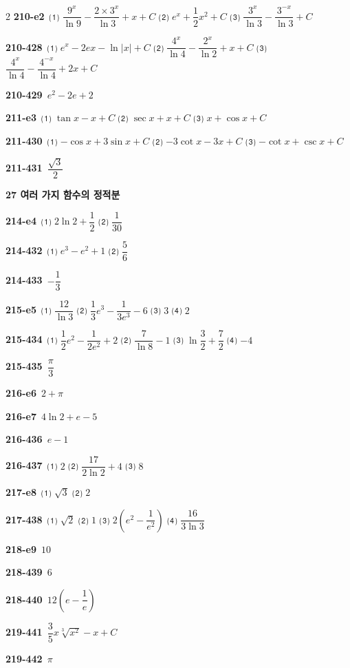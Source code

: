 \documentclass[10pt,a4paper]{article}
\begin{document}
\begin{multicols}{2}
\noindent\textbf{210-e2}\ ⑴ $\dfrac{9^x}{\ln 9}-\dfrac{2\times 3^x}{\ln 3}+x+C$ ⑵ $e^x+\dfrac{1}{2}x^2+C$ ⑶ $\dfrac{3^x}{\ln 3}-\dfrac{3^{-x}}{\ln 3}+C$\par
\noindent\textbf{210-428}\ ⑴ $e^x-2ex-\ln|x|+C$ ⑵ $\dfrac{4^x}{\ln 4}-\dfrac{2^x}{\ln 2}+x+C$ ⑶ $\dfrac{4^x}{\ln 4}-\dfrac{4^{-x}}{\ln 4}+2x+C$\par
\noindent\textbf{210-429}\ $e^2-2e+2$\par
\noindent\textbf{211-e3}\ ⑴ $\tan x-x+C$ ⑵ $\sec x+x+C$ ⑶ $x+\cos x+C$\par
\noindent\textbf{211-430}\ ⑴ $-\cos x+3\sin x+C$ ⑵ $-3\cot x-3x+C$ ⑶ $-\cot x+\csc x+C$\par
\noindent\textbf{211-431}\ $\dfrac{\sqrt{3}}{2}$\par
\noindent\textbf{27 여러 가지 함수의 정적분}\par\smallskip
\noindent\textbf{214-e4}\ ⑴ $2\ln 2+\dfrac{1}{2}$ ⑵ $\dfrac{1}{30}$\par
\noindent\textbf{214-432}\ ⑴ $e^3-e^2+1$ ⑵ $\dfrac{5}{6}$\par
\noindent\textbf{214-433}\ $-\dfrac{1}{3}$\par
\noindent\textbf{215-e5}\ ⑴ $\dfrac{12}{\ln 3}$ ⑵ $\dfrac{1}{3}e^3-\dfrac{1}{3e^3}-6$ ⑶ $3$ ⑷ $2$\par
\noindent\textbf{215-434}\ ⑴ $\dfrac{1}{2}e^2-\dfrac{1}{2e^2}+2$ ⑵ $\dfrac{7}{\ln 8}-1$ ⑶ $\ln\dfrac{3}{2}+\dfrac{7}{2}$ ⑷ $-4$\par
\noindent\textbf{215-435}\ $\dfrac{\pi}{3}$\par
\noindent\textbf{216-e6}\ $2+\pi$\par
\noindent\textbf{216-e7}\ $4\ln 2+e-5$\par
\noindent\textbf{216-436}\ $e-1$\par
\noindent\textbf{216-437}\ ⑴ $2$ ⑵ $\dfrac{17}{2\ln 2}+4$ ⑶ $8$\par
\noindent\textbf{217-e8}\ ⑴ $\sqrt{3}$ ⑵ $2$\par
\noindent\textbf{217-438}\ ⑴ $\sqrt{2}$ ⑵ $1$ ⑶ $2\left(e^2-\dfrac{1}{e^2}\right)$ ⑷ $\dfrac{16}{3\ln 3}$\par
\noindent\textbf{218-e9}\ $10$\par
\noindent\textbf{218-439}\ $6$\par
\noindent\textbf{218-440}\ $12\left(e-\dfrac{1}{e}\right)$\par
\noindent\textbf{219-441}\ $\dfrac{3}{5}x\sqrt[3]{x^2}-x+C$\par
\noindent\textbf{219-442}\ $\pi$\par

\end{multicols}
\end{document}
